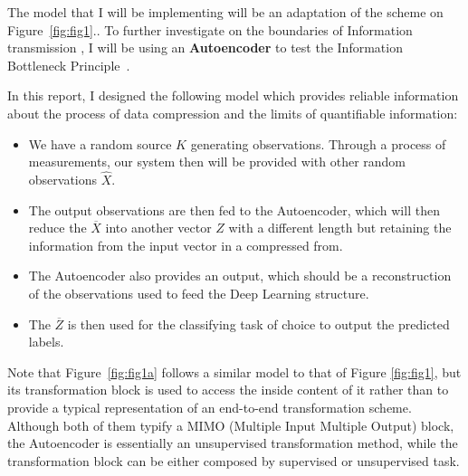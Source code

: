 The model that I will be implementing will be an adaptation of the scheme on Figure~\ref{fig:fig1}.. To further investigate on the boundaries of Information transmission , I will be using an \textbf{Autoencoder} to test the Information Bottleneck Principle~\cite{refToInfBottleNeck}. 


In this report, I designed the following model which provides reliable information about the process of data compression and the limits of quantifiable information:

\begin{itemize}
\item  We have a random source $K$ generating observations. Through a process of measurements, our system then will be provided with other random observations $\hat{X}$. 

\item The output observations  are then fed to the Autoencoder, which will then reduce the $\overline X$ into another vector $Z$ with a different length but retaining the information from the input vector in a compressed from. 

\item The Autoencoder also provides  an output, which should be a reconstruction of the observations used to feed the Deep Learning structure. 

\item The $\overline Z$ is then used for the classifying task of choice to output the predicted labels. 

\end{itemize}

Note that Figure~\ref{fig:fig1a} follows a similar model to that of Figure \ref{fig:fig1}, but its transformation block is used to access the inside content of it rather than to provide a typical representation of an end-to-end transformation scheme. Although both of them typify a MIMO (Multiple Input Multiple Output) block, the Autoencoder is essentially an unsupervised transformation method, while the transformation block can be either composed by supervised or unsupervised task.\par

